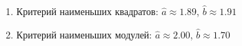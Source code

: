 \begin{enumerate}
\item Критерий наименьших квадратов:
$\hat{a}\approx 1.89$, $\hat{b}\approx 1.91$
\item Критерий наименьших модулей:
$\hat{a}\approx 2.00$, $\hat{b}\approx 1.70$
\end{enumerate}
